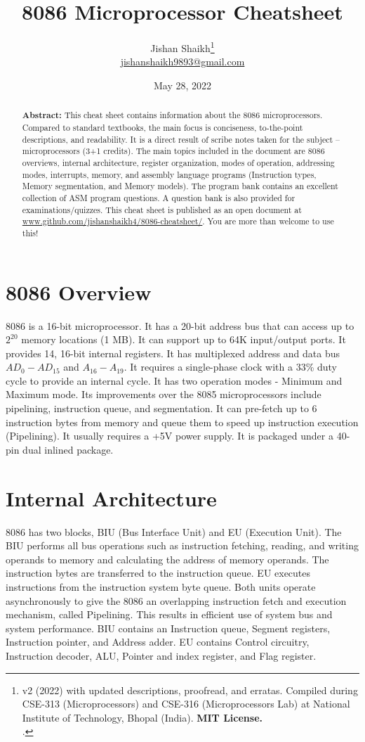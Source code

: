 \documentclass[12pt, a4paper]{scrartcl}
\title{8086 Microprocessor Cheatsheet}
\author{Jishan Shaikh\footnote{v2 (2022) with updated descriptions, proofread, and erratas. Compiled during CSE-313 (Microprocessors) and CSE-316 (Microprocessors Lab) at National Institute of Technology, Bhopal (India). \textbf{MIT License.}\\
		.}\\{\normalsize  \href{mailto:jishanshaikh9893@gmail.com}{jishanshaikh9893@gmail.com}}}
\date{May 28, 2022}
\begin{document}
\maketitle

\begin{abstract}
	\textbf{Abstract:} This cheat sheet contains information about the 8086 microprocessors. Compared to standard textbooks, the main focus is conciseness, to-the-point descriptions, and readability. It is a direct result of scribe notes taken for the subject -- microprocessors (3+1 credits). The main topics included in the document are 8086 overviews, internal architecture, register organization, modes of operation, addressing modes, interrupts, memory, and assembly language programs (Instruction types, Memory segmentation, and Memory models). The program bank contains an excellent collection of ASM program questions. A question bank is also provided for examinations/quizzes. This cheat sheet is published as an open document at \href{https://www.github.com/jishanshaikh4/8086-cheatsheet/}{www.github.com/jishanshaikh4/8086-cheatsheet/}. You are more than welcome to use this!
\end{abstract}

\section{8086 Overview}
	8086 is a 16-bit microprocessor. It has a 20-bit address bus that can access up to $2^{20}$ memory locations (1 MB). It can support up to 64K input/output ports. It provides 14, 16-bit internal registers. It has multiplexed address and data bus $AD_{0}-AD_{15}$ and $A_{16}-A_{19}$. It requires a single-phase clock with a 33\% duty cycle to provide an internal cycle. It has two operation modes - Minimum and Maximum mode. Its improvements over the 8085 microprocessors include pipelining, instruction queue, and segmentation. It can pre-fetch up to 6 instruction bytes from memory and queue them to speed up instruction execution (Pipelining). It usually requires a +5V power supply. It is packaged under a 40-pin dual inlined package.

\section{Internal Architecture}
	8086 has two blocks, BIU (Bus Interface Unit) and EU (Execution Unit). The BIU performs all bus operations such as instruction fetching, reading, and writing operands to memory and calculating the address of memory operands. The instruction bytes are transferred to the instruction queue. EU executes instructions from the instruction system byte queue. Both units operate asynchronously to give the 8086 an overlapping instruction fetch and execution mechanism, called Pipelining. This results in efficient use of system bus and system performance. BIU contains an Instruction queue, Segment registers, Instruction pointer, and Address adder. EU contains Control circuitry, Instruction decoder, ALU, Pointer and index register, and Flag register. 	\\
\end{document}
